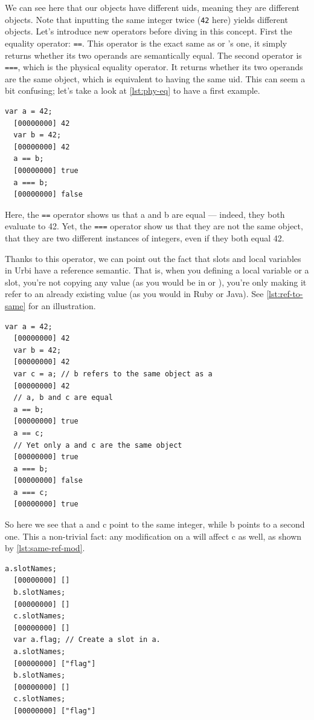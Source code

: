 \documentclass[openright,twoside,12pt]{report}
\newcommand{\java}{Java\xspace}
\newcommand{\ruby}{Ruby\xspace}
\newcommand{\urbi}{Urbi\xspace}
\newcommand{\lst}[1]{\autoref{lst:#1}}
\begin{document}
We can see here that our objects have different uids, meaning they are
different objects. Note that inputting the same integer twice
(\texttt{42} here) yields different objects. Let's introduce new
operators before diving in this concept. First the equality operator:
\texttt{==}. This operator is the exact same as \C or \Cxx's one, it
simply returns whether its two operands are semantically equal. The
second operator is \texttt{===}, which is the physical equality
operator. It returns whether its two operands are the same object,
which is equivalent to having the same uid. This can seem a bit
confusing; let's take a look at \lst{phy-eq} to have a first example.

\begin{lstlisting}[caption=Physical equality operator,
  label=lst:phy-eq]
  var a = 42;
  [00000000] 42
  var b = 42;
  [00000000] 42
  a == b;
  [00000000] true
  a === b;
  [00000000] false
\end{lstlisting}

Here, the \texttt{==} operator shows us that a and b are equal ---
indeed, they both evaluate to 42. Yet, the \texttt{===} operator show
us that they are not the same object, that they are two different
instances of integers, even if they both equal 42.

Thanks to this operator, we can point out the fact that slots and
local variables in \urbi have a reference semantic. That is, when you
defining a local variable or a slot, you're not copying any value (as
you would be in \C or \Cxx), you're only making it refer to an already
existing value (as you would in \ruby or \java). See \lst{ref-to-same}
for an illustration.

\begin{lstlisting}[caption=Two references to the same object,
  label=lst:ref-to-same]
  var a = 42;
  [00000000] 42
  var b = 42;
  [00000000] 42
  var c = a; // b refers to the same object as a
  [00000000] 42
  // a, b and c are equal
  a == b;
  [00000000] true
  a == c;
  // Yet only a and c are the same object
  [00000000] true
  a === b;
  [00000000] false
  a === c;
  [00000000] true
\end{lstlisting}

So here we see that a and c point to the same integer, while b points
to a second one. This a non-trivial fact: any modification on a will
affect c as well, as shown by \lst{same-ref-mod}.

\begin{lstlisting}[caption=Shared modification,
  label=lst:same-ref-mod]
  a.slotNames;
  [00000000] []
  b.slotNames;
  [00000000] []
  c.slotNames;
  [00000000] []
  var a.flag; // Create a slot in a.
  a.slotNames;
  [00000000] ["flag"]
  b.slotNames;
  [00000000] []
  c.slotNames;
  [00000000] ["flag"]
\end{lstlisting}
\end{document}
